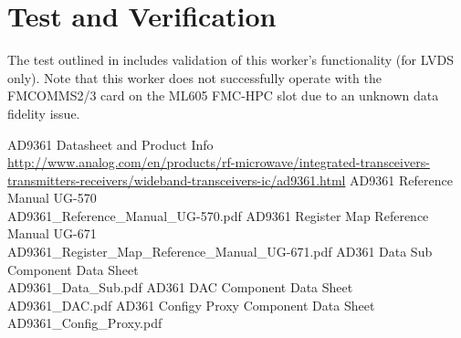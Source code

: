 \documentclass{article}
\begin{document}
\section*{Test and Verification}
The test outlined in \cite{dac_comp_datasheet} includes validation of this worker's functionality (for LVDS only). Note that this worker does not successfully operate with the FMCOMMS2/3 card on the ML605 FMC-HPC slot due to an unknown data fidelity issue.
\pagebreak
\begin{thebibliography}{1}

 AD9361 Datasheet and Product Info \\
\url{http://www.analog.com/en/products/rf-microwave/integrated-transceivers-transmitters-receivers/wideband-transceivers-ic/ad9361.html}
 AD9361 Reference Manual UG-570\\
AD9361\_Reference\_Manual\_UG-570.pdf
 AD9361 Register Map Reference Manual UG-671\\
AD9361\_Register\_Map\_Reference\_Manual\_UG-671.pdf
 AD361 Data Sub Component Data Sheet \\AD9361\_Data\_Sub.pdf
 AD361 DAC Component Data Sheet \\AD9361\_DAC.pdf
 AD361 Configy Proxy Component Data Sheet \\AD9361\_Config\_Proxy.pdf

\end{thebibliography}
\pagebreak
\end{document}
